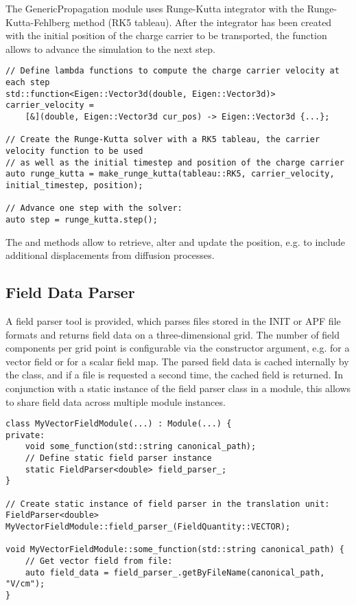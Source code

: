 The GenericPropagation module uses Runge-Kutta integrator with the Runge-Kutta-Fehlberg method (RK5 tableau).
After the integrator has been created with the initial position of the charge carrier to be transported, the  function allows to advance the simulation to the next step.
\begin{verbatim}
// Define lambda functions to compute the charge carrier velocity at each step
std::function<Eigen::Vector3d(double, Eigen::Vector3d)> carrier_velocity =
    [&](double, Eigen::Vector3d cur_pos) -> Eigen::Vector3d {...};

// Create the Runge-Kutta solver with a RK5 tableau, the carrier velocity function to be used
// as well as the initial timestep and position of the charge carrier
auto runge_kutta = make_runge_kutta(tableau::RK5, carrier_velocity, initial_timestep, position);

// Advance one step with the solver:
auto step = runge_kutta.step();
\end{verbatim}

The  and  methods allow to retrieve, alter and update the position, e.g. to include additional displacements from diffusion processes.

\subsection{Field Data Parser}
A field parser tool is provided, which parses files stored in the INIT or APF file formats and returns field data on a three-dimensional grid.
The number of field components per grid point is configurable via the constructor argument, e.g.  for a vector field or  for a scalar field map.
The parsed field data is cached internally by the class, and if a file is requested a second time, the cached field is returned.
In conjunction with a static instance of the field parser class in a module, this allows to share field data across multiple module instances.

\begin{verbatim}
class MyVectorFieldModule(...) : Module(...) {
private:
    void some_function(std::string canonical_path);
    // Define static field parser instance
    static FieldParser<double> field_parser_;
}

// Create static instance of field parser in the translation unit:
FieldParser<double> MyVectorFieldModule::field_parser_(FieldQuantity::VECTOR);

void MyVectorFieldModule::some_function(std::string canonical_path) {
    // Get vector field from file:
    auto field_data = field_parser_.getByFileName(canonical_path, "V/cm");
}
\end{verbatim}

